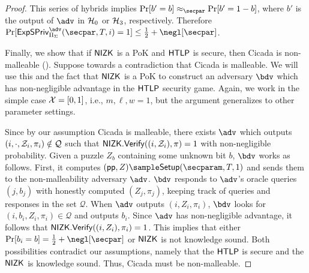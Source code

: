 \begin{proof}
    This series of hybrids implies $\Pr[b'=b] \approx_\secpar \Pr[b'=1-b]$, where $b'$ is the output of $\adv$ in $\mathcal{H}_0$ or $\mathcal{H}_3$, respectively. Therefore $\Pr[\Exp = 1] \leq \frac{1}{2} + \negl[\secpar]$.
    
    Finally, we show that if $\mathsf{NIZK}$ is a PoK and $\mathsf{HTLP}$ is secure, then Cicada is non-malleable (). Suppose towards a contradiction that Cicada is malleable. We will use this and the fact that $\mathsf{NIZK}$ is a PoK to construct an adversary $\bdv$ which has non-negligible advantage in the $\mathsf{HTLP}$ security game. Again, we work in the simple case $\mathcal{X} = [0,1]$, i.e., $m,\ell,w=1$, but the argument generalizes to other parameter settings.
    
    Since by our assumption Cicada is malleable, there exists $\adv$ which outputs $(i, \cdot, \mathcal{Z}_i, \pi_i) \notin \mathcal{Q}$ such that $\mathsf{NIZK}.\mathsf{Verify}((i,\allowbreak \mathcal{Z}_i), \pi)=1$ with non-negligible probability. 
    Given a puzzle $Z_b$ containing some unknown bit $b$, $\bdv$ works as follows. First, it computes $(\pparam, Z) \sample \Setup(\secparam, \Ttime, 1)$ and sends them to the non-malleability adversary $\adv$. $\bdv$ responds to $\adv$'s oracle queries $(j, b_j)$ with honestly computed $(Z_j, \pi_j)$, keeping track of queries and responses in the set $\mathcal{Q}$. When $\adv$ outputs $(i, Z_i, \pi_i)$, $\bdv$ looks for $(i, b_i, Z_i, \pi_i) \in \mathcal{Q}$ and outputs $b_i$. Since $\adv$ has non-negligible advantage, it follows that $\mathsf{NIZK}.\mathsf{Verify}((i, Z_i), \pi_i) = 1$. This implies that either $\Pr[b_i=b] = \frac{1}{2} + \negl[\secpar]$ or $\mathsf{NIZK}$ is not knowledge sound. Both possibilities contradict our assumptions, namely that the $\mathsf{HTLP}$ is secure and the $\mathsf{NIZK}$ is knowledge sound. Thus, Cicada must be non-malleable.
\end{proof}